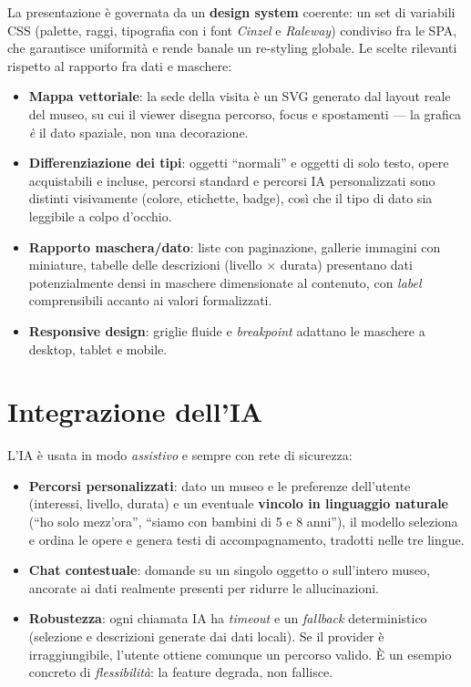 \documentclass[11pt,a4paper]{article}
\begin{document}
La presentazione è governata da un \textbf{design system} coerente: un set di
variabili CSS (palette, raggi, tipografia con i font \emph{Cinzel} e
\emph{Raleway}) condiviso fra le SPA, che garantisce uniformità e rende banale un
re-styling globale. Le scelte rilevanti rispetto al rapporto fra dati e
maschere:
\begin{itemize}[leftmargin=1.3em]
  \item \textbf{Mappa vettoriale}: la sede della visita è un SVG generato dal
    layout reale del museo, su cui il viewer disegna percorso, focus e
    spostamenti --- la grafica \emph{è} il dato spaziale, non una decorazione.
  \item \textbf{Differenziazione dei tipi}: oggetti ``normali'' e oggetti di solo
    testo, opere acquistabili e incluse, percorsi standard e percorsi IA
    personalizzati sono distinti visivamente (colore, etichette, badge), così
    che il tipo di dato sia leggibile a colpo d'occhio.
  \item \textbf{Rapporto maschera/dato}: liste con paginazione, gallerie
    immagini con miniature, tabelle delle descrizioni (livello $\times$ durata)
    presentano dati potenzialmente densi in maschere dimensionate al contenuto,
    con \emph{label} comprensibili accanto ai valori formalizzati.
  \item \textbf{Responsive design}: griglie fluide e \emph{breakpoint} adattano
    le maschere a desktop, tablet e mobile.
\end{itemize}

\section{Integrazione dell'IA}
\label{sec:ia}

L'IA è usata in modo \emph{assistivo} e sempre con rete di sicurezza:
\begin{itemize}[leftmargin=1.3em]
  \item \textbf{Percorsi personalizzati}: dato un museo e le preferenze
    dell'utente (interessi, livello, durata) e un eventuale \textbf{vincolo in
    linguaggio naturale} (``ho solo mezz'ora'', ``siamo con bambini di 5 e 8
    anni''), il modello seleziona e ordina le opere e genera testi di
    accompagnamento, tradotti nelle tre lingue.
  \item \textbf{Chat contestuale}: domande su un singolo oggetto o sull'intero
    museo, ancorate ai dati realmente presenti per ridurre le allucinazioni.
  \item \textbf{Robustezza}: ogni chiamata IA ha \emph{timeout} e un
    \emph{fallback} deterministico (selezione e descrizioni generate dai dati
    locali). Se il provider è irraggiungibile, l'utente ottiene comunque un
    percorso valido. È un esempio concreto di \emph{flessibilità}: la feature
    degrada, non fallisce.
\end{itemize}
\end{document}
